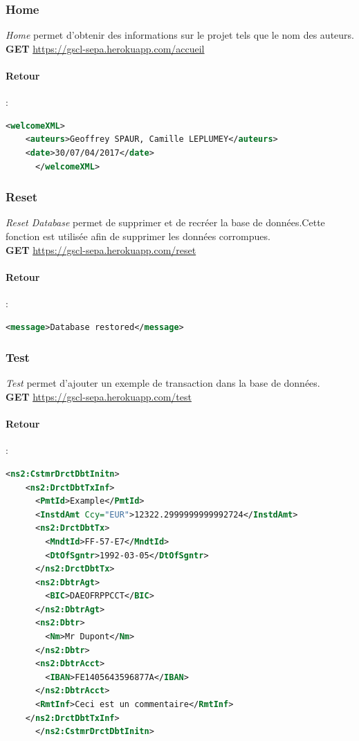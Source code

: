\documentclass{article}
\begin{document}
      \subsubsection{Home}
	\emph{Home} permet d'obtenir des informations sur le projet tels que le nom des auteurs.\\
	\textbf{GET} \url{https://gscl-sepa.herokuapp.com/accueil}
	\paragraph{Retour}:
	  \begin{lstlisting}[language=xml]
      <welcomeXML>
	<auteurs>Geoffrey SPAUR, Camille LEPLUMEY</auteurs>
	<date>30/07/04/2017</date>
      </welcomeXML>
	  \end{lstlisting}
	
      \subsubsection{Reset}
	\emph{Reset Database} permet de supprimer et de recréer la base de données.Cette fonction est utilisée afin de supprimer les données corrompues. \\
	\textbf{GET} \url{https://gscl-sepa.herokuapp.com/reset}
	\paragraph{Retour}:
	  \begin{lstlisting}[language=xml]
      <message>Database restored</message>
	  \end{lstlisting}
	
	\subsubsection{Test}
	\emph{Test} permet d'ajouter un exemple de transaction dans la base de données. \\
	\textbf{GET} \url{https://gscl-sepa.herokuapp.com/test}
	\paragraph{Retour}:
	  \begin{lstlisting}[language=xml]
      <ns2:CstmrDrctDbtInitn>
	<ns2:DrctDbtTxInf>
	  <PmtId>Example</PmtId>
	  <InstdAmt Ccy="EUR">12322.2999999999992724</InstdAmt>
	  <ns2:DrctDbtTx>
	    <MndtId>FF-57-E7</MndtId>
	    <DtOfSgntr>1992-03-05</DtOfSgntr>
	  </ns2:DrctDbtTx>
	  <ns2:DbtrAgt>
	    <BIC>DAEOFRPPCCT</BIC>
	  </ns2:DbtrAgt>
	  <ns2:Dbtr>
	    <Nm>Mr Dupont</Nm>
	  </ns2:Dbtr>
	  <ns2:DbtrAcct>
	    <IBAN>FE1405643596877A</IBAN>
	  </ns2:DbtrAcct>
	  <RmtInf>Ceci est un commentaire</RmtInf>
	</ns2:DrctDbtTxInf>
      </ns2:CstmrDrctDbtInitn>
	  \end{lstlisting}
	
\end{document}

